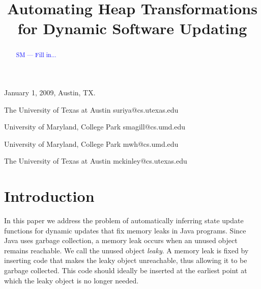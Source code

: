 \documentclass[natbib,preprint]{sigplanconf}
\newcommand{\stephencomment}[1]{\textcolor{blue}{SM --- #1}}
\begin{document}
 {January 1, 2009, Austin, TX.}


\title{Automating Heap Transformations for Dynamic Software Updating
    }




           {The University of Texas at Austin}
           {suriya@cs.utexas.edu}

           {University of Maryland, College Park}
           {smagill@cs.umd.edu}

           {University of Maryland, College Park}
           {mwh@cs.umd.edu}

           {The University of Texas at Austin}
           {mckinley@cs.utexas.edu}

\maketitle

\begin{abstract}
\stephencomment{Fill in...}



\end{abstract}

\section{Introduction}

In this paper we address the problem of automatically inferring state
update functions for dynamic updates that fix memory leaks in Java
programs.  Since Java uses garbage collection, a memory leak occurs
when an unused object remains reachable.  We call the unused object
\textit{leaky}.  A memory leak is fixed by inserting code that makes
the leaky object unreachable, thus allowing it to be garbage
collected.  This code should ideally be inserted at the earliest point
at which the leaky object is no longer needed.
\end{document}

